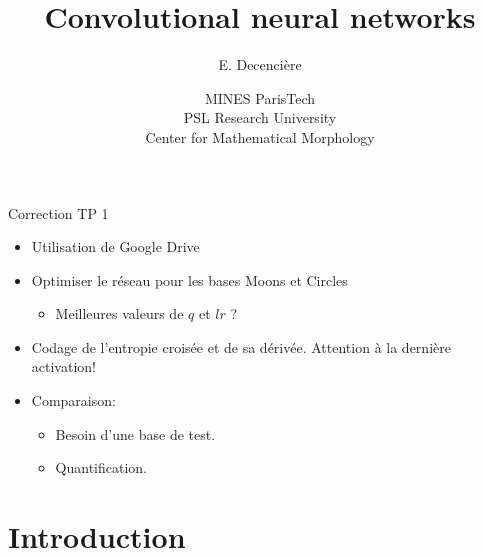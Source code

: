 \documentclass[xcolor=pdftex,dvipsnames,table,mathserif]{beamer}
\title{Convolutional neural networks}
\author{E. Decencière}
\date{MINES ParisTech\\
  PSL Research University\\
  Center for Mathematical Morphology
}
\begin{document}
\begin{frame}
  \titlepage
\end{frame}

\begin{frame}{Correction TP 1}

  \begin{itemize}
  \item Utilisation de Google Drive
  \item Optimiser le réseau pour les bases Moons et Circles
    \begin{itemize}
    \item Meilleures valeurs de $q$ et $lr$ ?
    \end{itemize}
  \item Codage de l'entropie croisée et de sa dérivée. \alert{Attention à la dernière activation!}
  \item Comparaison:
    \begin{itemize}
    \item Besoin d'une base de \alert{test}.
    \item Quantification.
    \end{itemize}
  \end{itemize}

\end{frame}



\section{Introduction}
\end{document}
